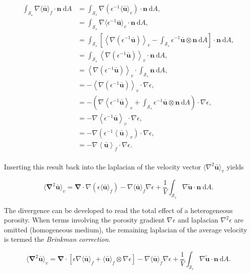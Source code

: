 \documentclass[a4paper,11pt]{article}
\begin{document}
\begin{align*}
\int_\mathcal{S_s}\nabla\langle\bm{\bar u}\rangle_f\cdot\bm n~\mathrm dA &= \int_{\mathcal S_s}\nabla\left(\epsilon^{-1}\langle\bm{\bar u}\rangle_v\right)\cdot\bm n~\mathrm dA,\\
    &= \int_{\mathcal S_s}\nabla\langle\epsilon^{-1}\bm{\bar u}\rangle_v\cdot\bm n~\mathrm dA,\\
    &= \int_{\mathcal S_s}\left[\left\langle\nabla\left(\epsilon^{-1}\bm{\bar u}\right)\right\rangle_v - \int_{\mathcal S_s}\epsilon^{-1}\bm{\bar u}\otimes\bm n~\mathrm dA\right]\cdot\bm n~\mathrm dA,\\
    &= \int_{\mathcal S_s}\left\langle\nabla\left(\epsilon^{-1}\bm{\bar u}\right)\right\rangle_v\cdot\bm n~\mathrm dA,\\
    &= \left\langle\nabla\left(\epsilon^{-1}\bm{\bar u}\right)\right\rangle_v\cdot\int_{\mathcal S_s}\bm n~\mathrm dA,\\
    &= -\left\langle\nabla\left(\epsilon^{-1}\bm{\bar u}\right)\right\rangle_v\cdot\nabla\epsilon,\\
    &= -\left(\nabla\left\langle\epsilon^{-1}\bm{\bar u}\right\rangle_v + \int_{\mathcal S_s}\epsilon^{-1}\bm{\bar u}\otimes\bm n~\mathrm dA\right)\cdot\nabla\epsilon,\\
    &= -\nabla\left\langle\epsilon^{-1}\bm{\bar u}\right\rangle_v\cdot\nabla\epsilon,\\
    &= -\nabla\left(\epsilon^{-1}\left\langle\bm{\bar u}\right\rangle_v\right)\cdot\nabla\epsilon,\\
    &= -\nabla\left\langle\bm{\bar u}\right\rangle_f\cdot\nabla\epsilon.\\
\end{align*}

Inserting this result back into the laplacian of the velocity vector ${\langle\nabla^2\bm{\bar u}\rangle_v}$ yields

$$\langle\bm\nabla^2\bm{\bar u}\rangle_v = \bm\nabla\cdot\nabla\left(\epsilon\langle\bm{\bar u}\rangle_f\right) -\nabla\langle \bm{\bar u}\rangle_f\nabla\epsilon + \frac{1}{V}\int_{\mathcal S_s}\nabla\tilde{\bm u}\cdot \bm n~\mathrm dA.$$

The divergence can be developed to read the total effect of a heterogeneous porosity. When terms involving the porosity gradient ${\nabla\epsilon}$ and laplacian ${\nabla^2\epsilon}$ are omitted (homogeneous medium), the remaining laplacian of the average velocity is termed the \emph{Brinkman correction}.

$$\langle\bm\nabla^2\bm{\bar u}\rangle_v = \bm\nabla\cdot\left[\epsilon\nabla\langle\bm{\bar u}\rangle_f + \langle\bm{\bar u}\rangle_f\otimes\nabla\epsilon\right] - \nabla\langle \bm{\bar u}\rangle_f\nabla\epsilon + \frac{1}{V}\int_{\mathcal S_s}\nabla\tilde{\bm u}\cdot \bm n~\mathrm dA.$$
\end{document}
